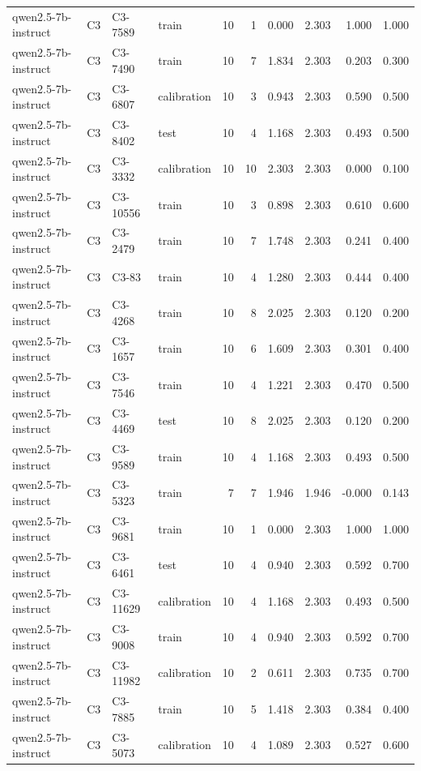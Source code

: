 \begin{table}
\begin{tabular}{llllrrrrrr}
qwen2.5-7b-instruct & C3 & C3-7589 & train & 10 & 1 & 0.000 & 2.303 & 1.000 & 1.000 \\
qwen2.5-7b-instruct & C3 & C3-7490 & train & 10 & 7 & 1.834 & 2.303 & 0.203 & 0.300 \\
qwen2.5-7b-instruct & C3 & C3-6807 & calibration & 10 & 3 & 0.943 & 2.303 & 0.590 & 0.500 \\
qwen2.5-7b-instruct & C3 & C3-8402 & test & 10 & 4 & 1.168 & 2.303 & 0.493 & 0.500 \\
qwen2.5-7b-instruct & C3 & C3-3332 & calibration & 10 & 10 & 2.303 & 2.303 & 0.000 & 0.100 \\
qwen2.5-7b-instruct & C3 & C3-10556 & train & 10 & 3 & 0.898 & 2.303 & 0.610 & 0.600 \\
qwen2.5-7b-instruct & C3 & C3-2479 & train & 10 & 7 & 1.748 & 2.303 & 0.241 & 0.400 \\
qwen2.5-7b-instruct & C3 & C3-83 & train & 10 & 4 & 1.280 & 2.303 & 0.444 & 0.400 \\
qwen2.5-7b-instruct & C3 & C3-4268 & train & 10 & 8 & 2.025 & 2.303 & 0.120 & 0.200 \\
qwen2.5-7b-instruct & C3 & C3-1657 & train & 10 & 6 & 1.609 & 2.303 & 0.301 & 0.400 \\
qwen2.5-7b-instruct & C3 & C3-7546 & train & 10 & 4 & 1.221 & 2.303 & 0.470 & 0.500 \\
qwen2.5-7b-instruct & C3 & C3-4469 & test & 10 & 8 & 2.025 & 2.303 & 0.120 & 0.200 \\
qwen2.5-7b-instruct & C3 & C3-9589 & train & 10 & 4 & 1.168 & 2.303 & 0.493 & 0.500 \\
qwen2.5-7b-instruct & C3 & C3-5323 & train & 7 & 7 & 1.946 & 1.946 & -0.000 & 0.143 \\
qwen2.5-7b-instruct & C3 & C3-9681 & train & 10 & 1 & 0.000 & 2.303 & 1.000 & 1.000 \\
qwen2.5-7b-instruct & C3 & C3-6461 & test & 10 & 4 & 0.940 & 2.303 & 0.592 & 0.700 \\
qwen2.5-7b-instruct & C3 & C3-11629 & calibration & 10 & 4 & 1.168 & 2.303 & 0.493 & 0.500 \\
qwen2.5-7b-instruct & C3 & C3-9008 & train & 10 & 4 & 0.940 & 2.303 & 0.592 & 0.700 \\
qwen2.5-7b-instruct & C3 & C3-11982 & calibration & 10 & 2 & 0.611 & 2.303 & 0.735 & 0.700 \\
qwen2.5-7b-instruct & C3 & C3-7885 & train & 10 & 5 & 1.418 & 2.303 & 0.384 & 0.400 \\
qwen2.5-7b-instruct & C3 & C3-5073 & calibration & 10 & 4 & 1.089 & 2.303 & 0.527 & 0.600 \\

\end{tabular}
\end{table}
